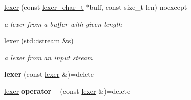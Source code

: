 \begin{DoxyCompactItemize}
\item 
\hyperlink{classnlohmann_1_1basic__json_1_1lexer_a944d97e5ede28ce67b08133059285d4e}{lexer} (const \hyperlink{classnlohmann_1_1basic__json_1_1lexer_a7858ae971d07f21ad47fa8a0421001db}{lexer\+\_\+char\+\_\+t} $\ast$buff, const size\+\_\+t len) noexcept
\begin{DoxyCompactList}\small\item\em a lexer from a buffer with given length \end{DoxyCompactList}\item 
\hyperlink{classnlohmann_1_1basic__json_1_1lexer_ad79f99ca1c4734a7103bc1d91162b4f3}{lexer} (std\+::istream \&s)
\begin{DoxyCompactList}\small\item\em a lexer from an input stream \end{DoxyCompactList}\item 
\hypertarget{classnlohmann_1_1basic__json_1_1lexer_a18cd0b0203240c650de724eaa372fe20}{}{\bfseries lexer} (const \hyperlink{classnlohmann_1_1basic__json_1_1lexer}{lexer} \&)=delete\label{classnlohmann_1_1basic__json_1_1lexer_a18cd0b0203240c650de724eaa372fe20}

\item 
\hypertarget{classnlohmann_1_1basic__json_1_1lexer_a862a22693d9fadbf4a5f00207da1dd00}{}\hyperlink{classnlohmann_1_1basic__json_1_1lexer}{lexer} {\bfseries operator=} (const \hyperlink{classnlohmann_1_1basic__json_1_1lexer}{lexer} \&)=delete\label{classnlohmann_1_1basic__json_1_1lexer_a862a22693d9fadbf4a5f00207da1dd00}


\end{DoxyCompactItemize}

